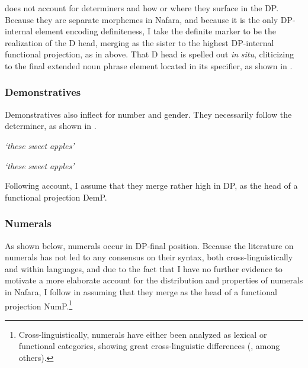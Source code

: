 \documentclass[output=paper]{langscibook}
\begin{document}
\citet{Cinque2005} does not account for determiners and how or where they surface in the DP. Because they are separate morphemes in Nafara, and because it is the only DP-internal element encoding definiteness, I take the definite marker to be the realization of the D head, merging as the sister to the highest DP-internal functional projection, as in  above. That D head is spelled out \textit{in} \textit{situ}, cliticizing to the final extended noun phrase element located in its specifier, as shown in .


\subsubsection{Demonstratives}
\label{sec:baron:2.1.3}
Demonstratives also inflect for number and gender. They necessarily follow the determiner, as shown in .

\ea\label{ex:baron:5}
\glt  \textit{‘these} \textit{sweet} \textit{apples’}    

\glt  \textit{‘these} \textit{sweet} \textit{apples’}
\z
\z

Following  account, I assume that they merge rather high in DP, as the head of a functional projection DemP. 


\subsubsection{Numerals}
\label{sec:baron:2.1.4}
As shown below, numerals occur in DP-final position. Because the literature on numerals has not led to any consensus on their syntax, both cross-linguistically and within languages, and due to the fact that I have no further evidence to motivate a more elaborate account for the distribution and properties of numerals in Nafara, I follow \citet{Cinque2005} in assuming that they merge as the head of a functional projection NumP.\footnote{Cross-linguistically, numerals have either been analyzed as lexical or functional categories, showing great cross-linguistic differences (\citealt{Danon2012,Ionin2006}, among others).} 
\end{document}

